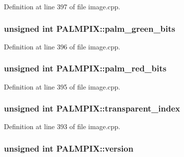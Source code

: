 Definition at line 397 of file image.\+cpp.

\hypertarget{structPALMPIX_a3640472263931e77689b659a3bb030f8}{
\subsubsection[{palm\+\_\+green\+\_\+bits}]{\setlength{\rightskip}{0pt plus 5cm}unsigned int P\+A\+L\+M\+P\+I\+X\+::palm\+\_\+green\+\_\+bits}}\label{structPALMPIX_a3640472263931e77689b659a3bb030f8}


Definition at line 396 of file image.\+cpp.

\hypertarget{structPALMPIX_a6afa309bd0d1f0e02e300fd4f059d0fd}{
\subsubsection[{palm\+\_\+red\+\_\+bits}]{\setlength{\rightskip}{0pt plus 5cm}unsigned int P\+A\+L\+M\+P\+I\+X\+::palm\+\_\+red\+\_\+bits}}\label{structPALMPIX_a6afa309bd0d1f0e02e300fd4f059d0fd}


Definition at line 395 of file image.\+cpp.

\hypertarget{structPALMPIX_a991dabc462c6bb8c229d5c6f2789a9ea}{
\subsubsection[{transparent\+\_\+index}]{\setlength{\rightskip}{0pt plus 5cm}unsigned int P\+A\+L\+M\+P\+I\+X\+::transparent\+\_\+index}}\label{structPALMPIX_a991dabc462c6bb8c229d5c6f2789a9ea}


Definition at line 393 of file image.\+cpp.

\hypertarget{structPALMPIX_a888fae9071575df1390d9dd301539f1f}{
\subsubsection[{version}]{\setlength{\rightskip}{0pt plus 5cm}unsigned int P\+A\+L\+M\+P\+I\+X\+::version}}\label{structPALMPIX_a888fae9071575df1390d9dd301539f1f}


